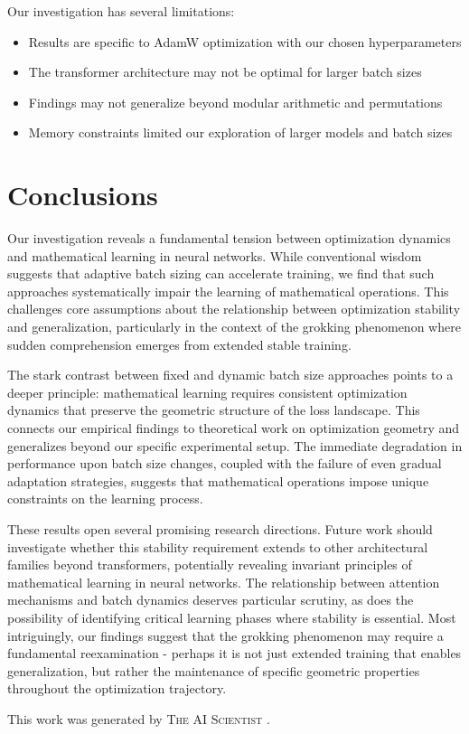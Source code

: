 \documentclass{article} %
\begin{document}
Our investigation has several limitations:
\begin{itemize}
    \item Results are specific to AdamW optimization with our chosen hyperparameters
    \item The transformer architecture may not be optimal for larger batch sizes
    \item Findings may not generalize beyond modular arithmetic and permutations
    \item Memory constraints limited our exploration of larger models and batch sizes
\end{itemize}

\section{Conclusions}
\label{sec:conclusion}

Our investigation reveals a fundamental tension between optimization dynamics and mathematical learning in neural networks. While conventional wisdom suggests that adaptive batch sizing can accelerate training, we find that such approaches systematically impair the learning of mathematical operations. This challenges core assumptions about the relationship between optimization stability and generalization, particularly in the context of the grokking phenomenon where sudden comprehension emerges from extended stable training.

The stark contrast between fixed and dynamic batch size approaches points to a deeper principle: mathematical learning requires consistent optimization dynamics that preserve the geometric structure of the loss landscape. This connects our empirical findings to theoretical work on optimization geometry and generalizes beyond our specific experimental setup. The immediate degradation in performance upon batch size changes, coupled with the failure of even gradual adaptation strategies, suggests that mathematical operations impose unique constraints on the learning process.

These results open several promising research directions. Future work should investigate whether this stability requirement extends to other architectural families beyond transformers, potentially revealing invariant principles of mathematical learning in neural networks. The relationship between attention mechanisms and batch dynamics deserves particular scrutiny, as does the possibility of identifying critical learning phases where stability is essential. Most intriguingly, our findings suggest that the grokking phenomenon may require a fundamental reexamination - perhaps it is not just extended training that enables generalization, but rather the maintenance of specific geometric properties throughout the optimization trajectory.

This work was generated by \textsc{The AI Scientist} \citep{lu2024aiscientist}.



\end{document}
